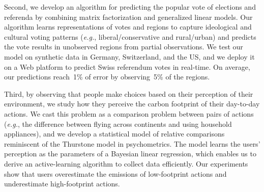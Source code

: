 
Second, we develop an algorithm for predicting the popular vote of elections and referenda by combining matrix factorization and generalized linear models.
Our algorithm learns representations of votes and regions to capture ideological and cultural voting patterns (\textit{e.g.}, liberal/conservative and rural/urban) and predicts the vote results in unobserved regions from partial observations.
We test our model on synthetic data in Germany, Switzerland, and the US, and we deploy it on a Web platform to predict Swiss referendum votes in real-time.
On average, our predictions reach~1\% of error by observing~5\% of the regions.

Third, by observing that people make choices based on their perception of their environment, we study how they perceive the carbon footprint of their day-to-day actions.
We cast this problem as a comparison problem between pairs of actions (\textit{e.g.}, the difference between flying across continents and using household appliances), and we develop a statistical model of relative comparisons reminiscent of the Thurstone model in psychometrics.
The model learns the users’ perception as the parameters of a Bayesian linear regression, which enables us to derive an active-learning algorithm to collect data efficiently.
Our experiments show that users overestimate the emissions of low-footprint actions and underestimate high-footprint actions.

